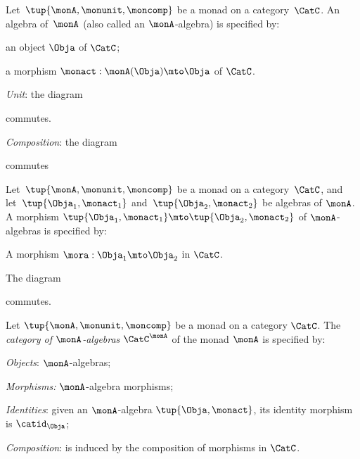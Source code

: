 \begin{ctdefinition}
    \label{def:algebramon}
Let~$\tup{\monA, \monunit, \moncomp}$ be a monad on a category~$\CatC$. An algebra of~$\monA$ (also called an $\monA$-algebra) is specified by: \

\constit
\begin{compactenum}
\item an object $\Obja$ of $\CatC$;
\item a morphism $\monact: \monA(\Obja) \mto \Obja$ of $\CatC$.
\end{compactenum}
\condit
\begin{compactenum}
\item \emph{Unit}: the diagram 
\begin{center}
  \end{center}
commutes.
\item \emph{Composition}: the diagram
\begin{center}
  \end{center}
commutes
\end{compactenum}
\end{ctdefinition}


\begin{ctdefinition}
    \label{def:algebramorphism}
Let~$\tup{\monA, \monunit, \moncomp}$ be a monad on a category~$\CatC$, and let~$\tup{\Obja_1, \monact_1}$ and~$\tup{\Obja_2, \monact_2}$ be algebras of $\monA$. A morphism $\tup{\Obja_1, \monact_1} \mto \tup{\Obja_2, \monact_2}$ of $\monA$-algebras is specified by: \

\constit
\begin{compactenum}
\item A morphism $\mora : \Obja_1 \mto \Obja_2$ in $\CatC$.
\end{compactenum}
\condit
\begin{compactenum}
\item The diagram
\begin{center}
  \end{center}
commutes. 
\end{compactenum}
\end{ctdefinition}


\begin{ctdefinition}
    \label{def:catofmonadalgebras}
Let $\tup{\monA, \monunit, \moncomp}$ be a monad on a category $\CatC$. The \emph{category of $\monA$-algebras} $\CatC^\monA$ of the monad $\monA$ is specified by:
\begin{compactenum}
\item \emph{Objects}: $\monA$-algebras;
\item \emph{Morphisms:} $\monA$-algebra morphisms;
\item \emph{Identities}: given an $\monA$-algebra $\tup{\Obja, \monact}$, its identity morphism is $\catid_\Obja$;
\item \emph{Composition}: is induced by the composition of morphisms in $\CatC$.
\end{compactenum}
\end{ctdefinition}


